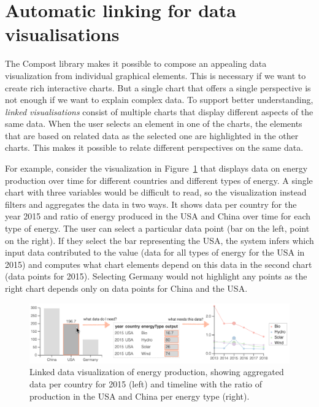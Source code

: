 \documentclass[fleqn,11pt]{report}
\theoremstyle{definition}
\begin{document}
\section{Automatic linking for data visualisations}

The Compost library makes it possible to compose an appealing data visualization from individual
graphical elements. This is necessary if we want to create rich interactive charts. But a single
chart that offers a single perspective is not enough if we want to explain complex data. To
support better understanding, \emph{linked visualisations} \citep{buja-1991-linking}
consist of multiple charts that display different aspects of the same data. When the user
selects an element in one of the charts, the elements that are based on related data as the
selected one are highlighted in the other charts. This makes it possible to relate different
perspectives on the same data.

For example, consider the visualization in Figure~\ref{fig:fluid} that displays data
on energy production over time for different countries and different types of energy.
A single chart with three variables would be difficult to read, so the visualization
instead filters and aggregates the data in two ways. It shows data per country for the year
2015 and ratio of energy produced in the USA and China over time for each type of energy.
The user can select a particular data point (bar on the left, point on the right). If they
select the bar representing the USA, the system infers which input data contributed to the
value (data for all types of energy for the USA in 2015) and computes what chart elements depend
on this data in the second chart (data points for 2015). Selecting Germany
would not highlight any points as the right chart depends only on data points for
China and the USA.

\begin{figure}[t]
  \vspace{-1.5em}
  \hspace{-3.5em}\includegraphics[scale=0.7]{img/fluid.png}
  \caption{Linked data visualization of energy production, showing aggregated data per
  country for 2015 (left) and timeline with the ratio of production
  in the USA and China per energy type (right).}
  \label{fig:fluid}
\end{figure}
\end{document}
